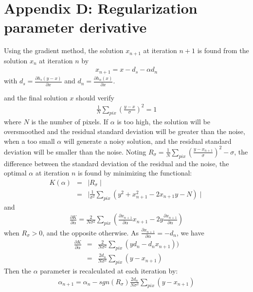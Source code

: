 \section*{Appendix D: Regularization parameter derivative}
Using the gradient method, the solution $x_{n+1}$ at iteration $n+1$ is found 
from the solution $x_n$ at iteration $n$ by
\begin{eqnarray}
x_{n+1} = x - d_s -  \alpha d_n
\end{eqnarray}
with $d_s = \frac{\partial h_s(y-x)}{\partial x}$ and $d_n = \frac{\partial h_n(x)}{\partial x}$.

and the final solution $x$ should verify
\begin{eqnarray}
\frac{1}{N} \sum_{pix} (\frac{y-x}{\sigma})^2 = 1
\end{eqnarray}
where $N$ is the number of pixels. If $\alpha$ is too high, the solution will
be oversmoothed and the residual standard deviation will be greater than the 
noise, when a too small $\alpha$ will generate a noisy solution, and the 
residual standard deviation will be smaller than the noise.
Noting $R_{\sigma}  = \frac{1}{N} \sum_{pix} (\frac{y-x_{n+1}}{\sigma})^2 - \sigma$,
the difference between the standard deviation of the residual and the noise,
the optimal $\alpha$ at iteration $n$ is found by minimizing the functional:
\begin{eqnarray}
K(\alpha) & = & \mid  R_{\sigma} \mid \\
          & = & \mid \frac{1}{\sigma^2}\sum_{pix} (y^2  +  x_{n+1}^2 - 2 x_{n+1} y - N) \mid
\end{eqnarray}
and 
\begin{eqnarray}
\frac{\partial K}{\partial \alpha} = \frac{2}{N\sigma^2} \sum_{pix}  
 (\frac{\partial x_{n+1}}{\partial \alpha} x_{n+1} 
   - 2y \frac{\partial x_{n+1}}{\partial \alpha})
\end{eqnarray}
when $R_{\sigma} > 0$, and the opposite otherwise.
As $\frac{\partial x_{n+1}}{\partial \alpha} = - d_n$, we have
\begin{eqnarray}
\frac{\partial K}{\partial \alpha} & = & \frac{2}{N\sigma^2} \sum_{pix} (y d_n - d_n x_{n+1})) \\
                                   & = & \frac{2d_n }{N\sigma^2}\sum_{pix}  (y - x_{n+1})
\end{eqnarray}
Then the $\alpha$ parameter is recalculated at each iteration by:
\begin{eqnarray}
\alpha_{n+1} = \alpha_n - sgn(R_{\sigma}) \frac{2d_n }{N\sigma^2} \sum_{pix} (y - x_{n+1})
\end{eqnarray}

  

